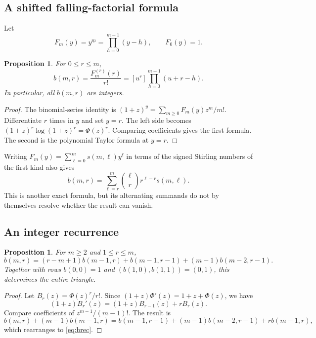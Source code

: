 \documentclass[11pt,a4paper]{article}
\numberwithin{equation}{section}
\newtheorem{proposition}[theorem]{Proposition}
\theoremstyle{definition}
\theoremstyle{remark}
\newcommand{\coef}[2]{[#1^{#2}]}
\newcommand{\fall}[2]{#1^{\underline{#2}}}
\begin{document}
\subsection{A shifted falling-factorial formula}
Let
\[
 F_m(y)=\fall{y}{m}=\prod_{h=0}^{m-1}(y-h),\qquad F_0(y)=1.
\]

\begin{proposition}\label{prop:falling}
For $0\le r\le m$,
\begin{equation}\label{eq:falling}
 b(m,r)=\frac{F_m^{(r)}(r)}{r!}
       =\coef{u}{r}\prod_{h=0}^{m-1}(u+r-h).
\end{equation}
In particular, all $b(m,r)$ are integers.
\end{proposition}
\begin{proof}
The binomial-series identity is
$(1+z)^y=\sum_{m\ge0}F_m(y)z^m/m!$.
Differentiate $r$ times in $y$ and set $y=r$. The left side becomes
$(1+z)^r\log(1+z)^r=\Phi(z)^r$. Comparing coefficients gives the first
formula. The second is the polynomial Taylor formula at $y=r$.
\end{proof}

Writing $F_m(y)=\sum_{\ell=0}^m s(m,\ell)y^\ell$ in terms of the signed
Stirling numbers of the first kind also gives
\begin{equation}\label{eq:stirling}
 b(m,r)=\sum_{\ell=r}^m\binom\ell r r^{\ell-r}s(m,\ell).
\end{equation}
This is another exact formula, but its alternating summands do not by
themselves resolve whether the result can vanish.

\subsection{An integer recurrence}
\begin{proposition}\label{prop:brec}
For $m\ge2$ and $1\le r\le m$,
\begin{equation}\label{eq:brec}
 b(m,r)=(r-m+1)b(m-1,r)+b(m-1,r-1)+(m-1)b(m-2,r-1).
\end{equation}
Together with rows $b(0,0)=1$ and $(b(1,0),b(1,1))=(0,1)$, this determines
the entire triangle.
\end{proposition}
\begin{proof}
Let $B_r(z)=\Phi(z)^r/r!$. Since
$(1+z)\Phi'(z)=1+z+\Phi(z)$, we have
\[
 (1+z)B_r'(z)=(1+z)B_{r-1}(z)+rB_r(z).
\]
Compare coefficients of $z^{m-1}/(m-1)!$. The result is
\[
 b(m,r)+(m-1)b(m-1,r)
 =b(m-1,r-1)+(m-1)b(m-2,r-1)+r b(m-1,r),
\]
which rearranges to \eqref{eq:brec}.
\end{proof}
\end{document}
